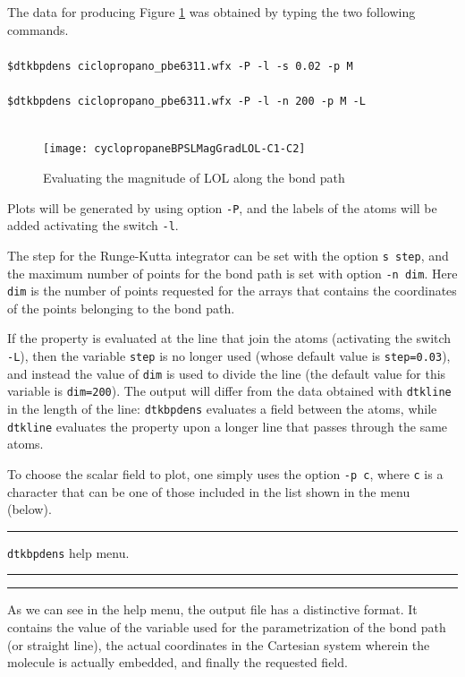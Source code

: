 The data for producing Figure \ref{fig:dtkbpdensusex} was obtained by typing the two following commands.\\
\phantom{M}\\
\texttt{\phantom{MMM}\$dtkbpdens ciclopropano\_pbe6311.wfx -P -l -s 0.02 -p M}\\\phantom{M}\\
\texttt{\phantom{MMM}\$dtkbpdens ciclopropano\_pbe6311.wfx -P -l -n 200 -p M -L}\\\phantom{M}\\
%
\begin{figure}[ht!]
\centering
\texttt{[image: cyclopropaneBPSLMagGradLOL-C1-C2]}
\caption{Evaluating the magnitude of LOL along the bond path}\label{fig:dtkbpdensusex}
\end{figure}
%

Plots will be generated by using option \texttt{-P}, and the labels of the atoms will be added activating the switch \texttt{-l}.

The step for the Runge-Kutta integrator can be set with the option \texttt{s step}, and the maximum number of points for the bond path is set with option \texttt{-n dim}. Here \texttt{dim} is the number of points requested for the arrays that contains the coordinates of the points belonging to the bond path.

If the property is evaluated at the line that join the atoms (activating the switch \texttt{-L}), then the variable \texttt{step} is no longer used (whose default value is \texttt{step=0.03}), and instead the value of \texttt{dim} is used to divide the line (the default value for this variable is \texttt{dim=200}). The output will differ from the data obtained with \texttt{dtkline} in the length of the line: \texttt{dtkbpdens} evaluates a field between the atoms, while \texttt{dtkline} evaluates the property upon a longer line that passes through the same atoms.

To choose the scalar field to plot, one simply uses the option \texttt{-p c}, where \texttt{c} is a character that can be one of those included in the list shown in the menu (below).

\rule{\textwidth}{1pt}
{\center\texttt{dtkbpdens} help menu.\\}
\rule{\textwidth}{1pt}
\begin{footnotesize}
\end{footnotesize}
\rule{\textwidth}{1pt}

As we can see in the help menu, the output file has a distinctive format. It contains the value of the variable used for the parametrization of the bond path (or straight line), the actual coordinates in the Cartesian system wherein the molecule is actually embedded, and finally the requested field.

